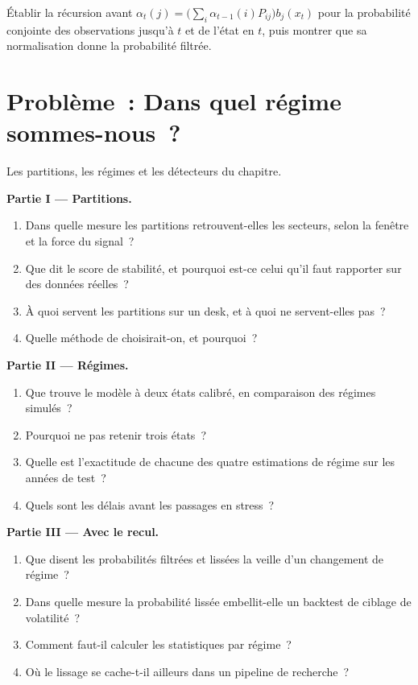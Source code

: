 \begin{exercise}[$\star\star\star$]\label{exo:ml:clustering-regimes-and-anomaly-detection:8}
Établir la récursion avant $\alpha_t(j) = \big(\sum_i\alpha_{t-1}(i)P_{ij}\big)b_j(x_t)$ pour la probabilité conjointe des
observations jusqu'à $t$ et de l'état en $t$, puis montrer que sa normalisation donne la probabilité filtrée.
\end{exercise}

\section{Problème~: Dans quel régime sommes-nous~?}

\begin{problem}\label{pb:ml:clustering-regimes-and-anomaly-detection:1}
Les partitions, les régimes et les détecteurs du chapitre.

\medskip\noindent\textbf{Partie I --- Partitions.}
\begin{enumerate}
\item Dans quelle mesure les partitions retrouvent-elles les secteurs, selon la fenêtre et la force du signal~?
\item Que dit le score de stabilité, et pourquoi est-ce celui qu'il faut rapporter sur des données réelles~?
\item À quoi servent les partitions sur un desk, et à quoi ne servent-elles pas~?
\item Quelle méthode de  choisirait-on, et pourquoi~?
\end{enumerate}

\medskip\noindent\textbf{Partie II --- Régimes.}
\begin{enumerate}[resume]
\item Que trouve le modèle à deux états calibré, en comparaison des régimes simulés~?
\item Pourquoi ne pas retenir trois états~?
\item Quelle est l'exactitude de chacune des quatre estimations de régime sur les années de test~?
\item Quels sont les délais avant les passages en stress~?
\end{enumerate}

\medskip\noindent\textbf{Partie III --- Avec le recul.}
\begin{enumerate}[resume]
\item Que disent les probabilités filtrées et lissées la veille d'un changement de régime~?
\item Dans quelle mesure la probabilité lissée embellit-elle un backtest de ciblage de volatilité~?
\item Comment faut-il calculer les statistiques par régime~?
\item Où le lissage se cache-t-il ailleurs dans un pipeline de recherche~?
\end{enumerate}


\end{problem}
